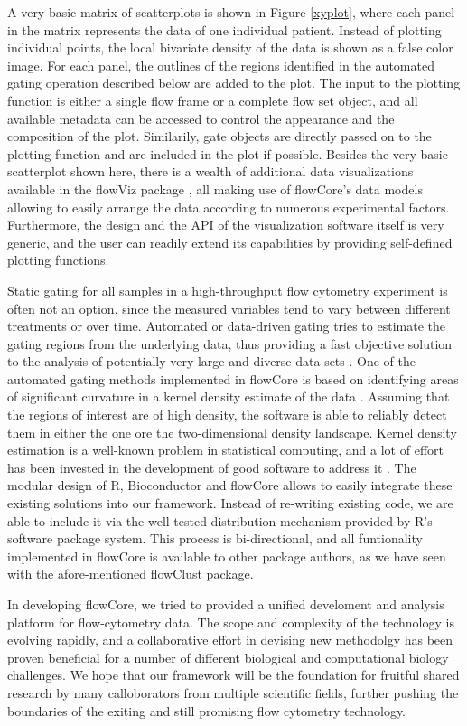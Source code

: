 \documentclass[12pt]{article}
\begin{document}
A very basic matrix of scatterplots is shown in Figure \ref{xyplot},
where each panel in the matrix represents the data of one individual
patient. Instead of plotting individual points, the local bivariate
density of the data is shown as a false color image. For each panel,
the outlines of the regions identified in the automated gating
operation described below are added to the plot. The input to the
plotting function is either a single flow frame or a complete flow set
object, and all available metadata can be accessed to control the
appearance and the composition of the plot. Similarily, gate objects
are directly passed on to the plotting function and are included in
the plot if possible. Besides the very basic scatterplot shown here,
there is a wealth of additional data visualizations available in the
flowViz package \citep{sarkar2008ufv}, all making use of flowCore's data
models allowing to easily arrange the data according to numerous
experimental factors. Furthermore, the design and the API of the
visualization software itself is very generic, and the user can
readily extend its capabilities by providing self-defined plotting
functions.

Static gating for all samples in a high-throughput flow cytometry
experiment is often not an option, since the measured variables tend
to vary between different treatments or over time. Automated or
data-driven gating tries to estimate the gating regions from the
underlying data, thus providing a fast objective solution to the
analysis of potentially very large and diverse data sets
\citep{lo2008agf}. One of the automated gating methods implemented in
flowCore is based on identifying areas of significant curvature in a
kernel density estimate of the data
\citep{wand2008,wand2008_2}. Assuming that the regions of interest are
of high density, the software is able to reliably detect them in
either the one ore the two-dimensional density landscape. Kernel
density estimation is a well-known problem in statistical computing,
and a lot of effort has been invested in the development of good
software to address it \citep{wand2008,wand2008_2}. The modular design
of R, Bioconductor and flowCore allows to easily integrate these
existing solutions into our framework. Instead of re-writing existing
code, we are able to include it via the well tested distribution
mechanism provided by R's software package system. This process is
bi-directional, and all funtionality implemented in flowCore is
available to other package authors, as we have seen with the
afore-mentioned flowClust package.

In developing flowCore, we tried to provided a unified develoment and
analysis platform for flow-cytometry data. The scope and complexity of
the technology is evolving rapidly, and a collaborative effort in
devising new methodolgy has been proven beneficial for a number of
different biological and computational biology challenges. We hope
that our framework will be the foundation for fruitful shared research
by many calloborators from multiple scientific fields, further pushing
the boundaries of the exiting and still promising flow
cytometry technology.



  
 
\end{document}
